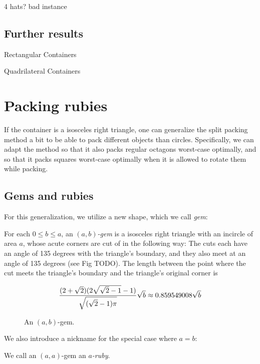 \documentclass[a4paper,style=print,bibliography=totoc,nexus,lnum,extramargin]{tubsbook}
\begin{document}
4 hats? bad instance

\section{Further results}

Rectangular Containers

Quadrilateral Containers

\chapter{Packing rubies}

If the container is a isosceles right triangle, one can generalize the split packing method a bit to be able to pack different objects than circles. Specifically, we can adapt the method so that it also packs regular octagons worst-case optimally, and so that it packs squares worst-case optimally when it is allowed to rotate them while packing.

\section{Gems and rubies}

For this generalization, we utilize a new shape, which we call \emph{gem}:

\begin{definition}
    For each $0 \le b \le a$, an \emph{$(a,b)$-gem} is a isosceles right triangle with an incircle of area $a$, whose acute corners are cut of in the following way: The cuts each have an angle of 135 degrees with the triangle's boundary, and they also meet at an angle of 135 degrees (see Fig TODO). The length between the point where the cut meets the triangle's boundary and the triangle's original corner is

    $$\frac{(2+\sqrt{2})(2\sqrt{\sqrt{2}-1}-1)}{\sqrt{(\sqrt{2}-1)\pi}}\sqrt{b} \approx 0.859549008 \sqrt{b}$$
\end{definition}

\begin{figure}

    \caption{An $(a,b)$-gem.}
    \label{fig:hat}
\end{figure}

We also introduce a nickname for the special case where $a=b$:

\begin{definition}
    We call an $(a,a)$-gem an \emph{$a$-ruby}.
\end{definition}
\end{document}
